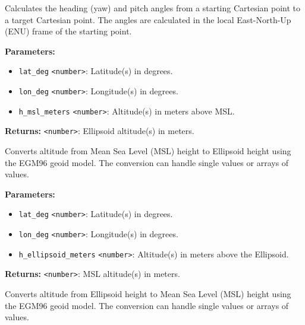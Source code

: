 \documentclass[12pt,a4paper]{article}
\begin{document}
\noindent Calculates the heading (yaw) and pitch angles from a starting Cartesian point to a target Cartesian point.
The angles are calculated in the local East-North-Up (ENU) frame of the starting point.

\vspace{5mm}
\noindent {}


\noindent \textbf{Parameters:}
\begin{itemize}
  \item \texttt{lat\_deg} \texttt{<number>}: Latitude(s) in degrees.
  \item \texttt{lon\_deg} \texttt{<number>}: Longitude(s) in degrees.
  \item \texttt{h\_msl\_meters} \texttt{<number>}: Altitude(s) in meters above MSL.
\end{itemize}

\noindent \textbf{Returns:} \texttt{<number>}: Ellipsoid altitude(s) in meters.

\noindent Converts altitude from Mean Sea Level (MSL) height to Ellipsoid height using the EGM96 geoid model.
The conversion can handle single values or arrays of values.

\vspace{5mm}
\noindent {}


\noindent \textbf{Parameters:}
\begin{itemize}
  \item \texttt{lat\_deg} \texttt{<number>}: Latitude(s) in degrees.
  \item \texttt{lon\_deg} \texttt{<number>}: Longitude(s) in degrees.
  \item \texttt{h\_ellipsoid\_meters} \texttt{<number>}: Altitude(s) in meters above the Ellipsoid.
\end{itemize}

\noindent \textbf{Returns:} \texttt{<number>}: MSL altitude(s) in meters.

\noindent Converts altitude from Ellipsoid height to Mean Sea Level (MSL) height using the EGM96 geoid model.
The conversion can handle single values or arrays of values.

\vspace{5mm}
\noindent {}
\end{document}
